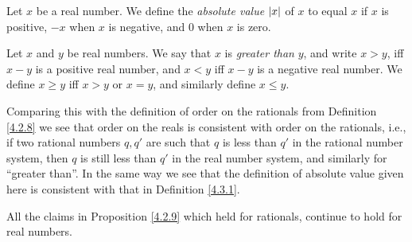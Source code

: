 \begin{definition}\label{5.4.5}
    Let \(x\) be a real number.
    We define the \emph{absolute value} \(\abs*{x}\) of \(x\) to equal \(x\) if \(x\) is positive, \(-x\) when \(x\) is negative, and \(0\) when \(x\) is zero.
\end{definition}

\begin{definition}\label{5.4.6}
    Let \(x\) and \(y\) be real numbers.
    We say that \(x\) is \emph{greater than} \(y\), and write \(x > y\), iff \(x - y\) is a positive real number, and \(x < y\) iff \(x - y\) is a negative real number.
    We define \(x \geq y\) iff \(x > y\) or \(x = y\), and similarly define \(x \leq y\).
\end{definition}

\begin{note}
    Comparing this with the definition of order on the rationals from Definition \ref{4.2.8} we see that order on the reals is consistent with order on the rationals, i.e., if two rational numbers \(q, q'\) are such that \(q\) is less than \(q'\) in the rational number system, then \(q\) is still less than \(q'\) in the real number system, and similarly for ``greater than''.
    In the same way we see that the definition of absolute value given here is consistent with that in Definition \ref{4.3.1}.
\end{note}

\begin{proposition}\label{5.4.7}
    All the claims in Proposition \ref{4.2.9} which held for rationals, continue to hold for real numbers.
\end{proposition}

